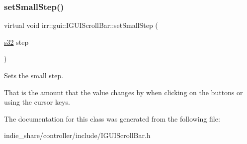 \subsubsection{\texorpdfstring{set\+Small\+Step()}{setSmallStep()}\hspace{0.1cm}{\footnotesize\ttfamily [2/2]}}
{\footnotesize\ttfamily virtual void irr\+::gui\+::\+I\+G\+U\+I\+Scroll\+Bar\+::set\+Small\+Step (\begin{DoxyParamCaption}\item[{\hyperlink{namespaceirr_ac66849b7a6ed16e30ebede579f9b47c6}{s32}}]{step }\end{DoxyParamCaption})\hspace{0.3cm}{\ttfamily [pure virtual]}}



Sets the small step. 

That is the amount that the value changes by when clicking on the buttons or using the cursor keys. 

The documentation for this class was generated from the following file\+:\begin{DoxyCompactItemize}
\item 
indie\+\_\+share/controller/include/I\+G\+U\+I\+Scroll\+Bar.\+h\end{DoxyCompactItemize}
